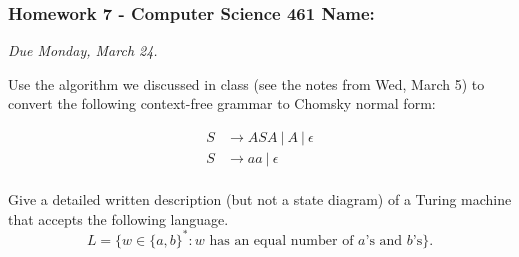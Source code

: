 \documentclass[12pt]{exam}
\begin{document}
\pagestyle{empty}
\subsubsection*{Homework 7 - Computer Science 461 \hfill Name: \underline{\hspace*{2in}}}

\textit{Due Monday, March 24.} %

\begin{questions}

\question Use the algorithm we discussed in class (see the notes from Wed, March 5) to convert the following context-free grammar to Chomsky normal form:

\begin{minipage}{1.5in}
\begin{align*}
S &\rightarrow ASA ~|~ A ~|~ \epsilon \\
S &\rightarrow aa ~|~ \epsilon \\
\end{align*}
\end{minipage}
\vfill


\question Give a detailed written description (but not a state diagram) of a Turing machine that accepts the following language.
$$L = \{ w \in \{a,b\}^* : w \text{ has an equal number of }a\text{'s and }b\text{'s} \}.$$
\vfill


\end{questions}
\end{document}
